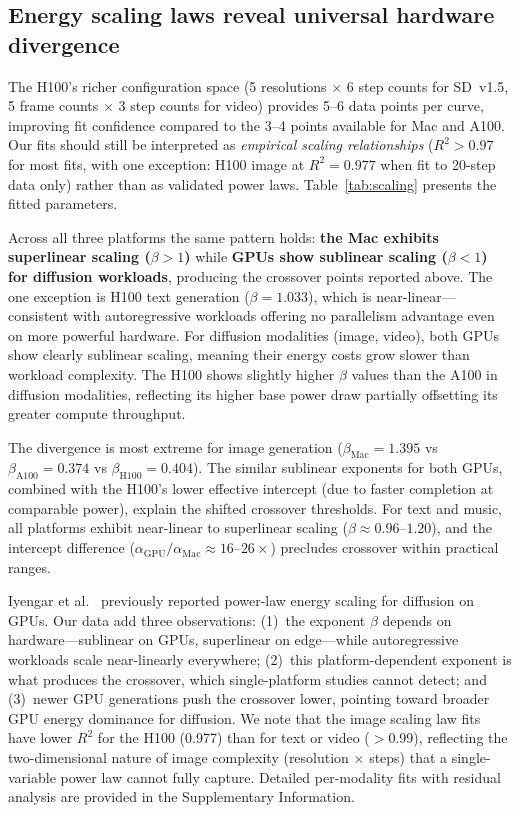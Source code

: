 \documentclass[preprint,12pt]{elsarticle}
\begin{document}
\subsection{Energy scaling laws reveal universal hardware divergence}

The H100's richer configuration space (5 resolutions $\times$ 6 step counts for SD~v1.5, 5 frame counts $\times$ 3 step counts for video) provides 5--6 data points per curve, improving fit confidence compared to the 3--4 points available for Mac and A100. Our fits should still be interpreted as \textit{empirical scaling relationships} ($R^2 > 0.97$ for most fits, with one exception: H100 image at $R^2 = 0.977$ when fit to 20-step data only) rather than as validated power laws. Table~\ref{tab:scaling} presents the fitted parameters.

Across all three platforms the same pattern holds: \textbf{the Mac exhibits superlinear scaling ($\beta > 1$)} while \textbf{GPUs show sublinear scaling ($\beta < 1$) for diffusion workloads}, producing the crossover points reported above. The one exception is H100 text generation ($\beta = 1.033$), which is near-linear---consistent with autoregressive workloads offering no parallelism advantage even on more powerful hardware. For diffusion modalities (image, video), both GPUs show clearly sublinear scaling, meaning their energy costs grow slower than workload complexity. The H100 shows slightly higher $\beta$ values than the A100 in diffusion modalities, reflecting its higher base power draw partially offsetting its greater compute throughput.

The divergence is most extreme for image generation ($\beta_\text{Mac} = 1.395$ vs $\beta_\text{A100} = 0.374$ vs $\beta_\text{H100} = 0.404$). The similar sublinear exponents for both GPUs, combined with the H100's lower effective intercept (due to faster completion at comparable power), explain the shifted crossover thresholds. For text and music, all platforms exhibit near-linear to superlinear scaling ($\beta \approx 0.96$--$1.20$), and the intercept difference ($\alpha_\text{GPU} / \alpha_\text{Mac} \approx 16$--$26\times$) precludes crossover within practical ranges.

Iyengar et al.~\cite{castano2025energy} previously reported power-law energy scaling for diffusion on GPUs. Our data add three observations: (1)~the exponent $\beta$ depends on hardware---sublinear on GPUs, superlinear on edge---while autoregressive workloads scale near-linearly everywhere; (2)~this platform-dependent exponent is what produces the crossover, which single-platform studies cannot detect; and (3)~newer GPU generations push the crossover lower, pointing toward broader GPU energy dominance for diffusion. We note that the image scaling law fits have lower $R^2$ for the H100 (0.977) than for text or video ($>$0.99), reflecting the two-dimensional nature of image complexity (resolution $\times$ steps) that a single-variable power law cannot fully capture. Detailed per-modality fits with residual analysis are provided in the Supplementary Information.
\end{document}
